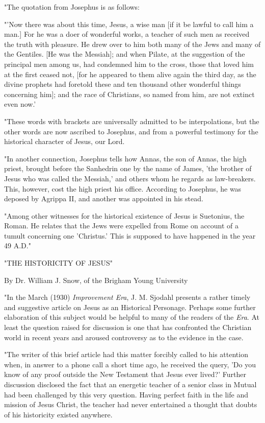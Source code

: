 "The quotation from Josephus is as follows:

"'Now there was about this time, Jesus, a wise man [if it be lawful to call him a man.] For he
was a doer of wonderful works, a teacher of such men as received the truth with pleasure. He
drew over to him both many of the Jews and many of the Gentiles. [He was the Messiah];
and when Pilate, at the suggestion of the principal men among us, had condemned him to the
cross, those that loved him at the first ceased not, [for he appeared to them alive again the
third day, as the divine prophets had foretold these and ten thousand other wonderful things
concerning him]; and the race of Christians, so named from him, are not extinct even now.'

"These words with brackets are universally admitted to be interpolations, but the other words
are now ascribed to Josephus, and from a powerful testimony for the historical character of
Jesus, our Lord.

"In another connection, Josephus tells how Annas, the son of Annas, the high priest, brought
before the Sanhedrin one by the name of James, 'the brother of Jesus who was called the
Messiah,' and others whom he regards as law-breakers. This, however, cost the high priest
his office. According to Josephus, he was deposed by Agrippa II, and another was appointed
in his stead.

"Among other witnesses for the historical existence of Jesus is Suetonius, the Roman. He
relates that the Jews were expelled from Rome on account of a tumult concerning one
'Christus.' This is supposed to have happened in the year 49 A.D."

"THE HISTORICITY OF JESUS"

By Dr. William J. Snow, of the Brigham Young University

"In the March (1930) \textit{Improvement Era}, J. M. Sjodahl presents a rather timely and suggestive
article on Jesus as an Historical Personage. Perhaps some further elaboration of this subject
would be helpful to many of the readers of the \textit{Era}. At least the question raised for discussion
is one that has confronted the Christian world in recent years and aroused controversy as to
the evidence in the case.

"The writer of this brief article had this matter forcibly called to his attention when, in answer
to a phone call a short time ago, he received the query, 'Do you know of any proof outside
the New Testament that Jesus ever lived?' Further discussion disclosed the fact that an
energetic teacher of a senior class in Mutual had been challenged by this very question.
Having perfect faith in the life and mission of Jesus Christ, the teacher had never entertained
a thought that doubts of his historicity existed anywhere.

